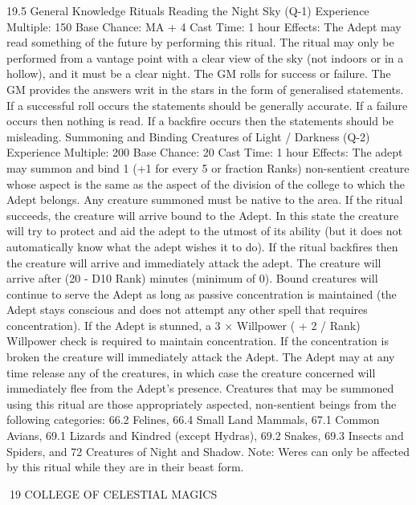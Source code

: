 \documentclass[a4paper]{article}
\begin{document}
\begin{multicols}{3}
19.5 General Knowledge Rituals
Reading the Night Sky (Q-1)
Experience Multiple: 150
Base Chance: MA + 4%
Cast Time: 1 hour
Effects: The Adept may read something of the
future by performing this ritual. The ritual may
only be performed from a vantage point with a
clear view of the sky (not indoors or in a hollow),
and it must be a clear night. The GM rolls for
success or failure. The GM provides the answers
writ in the stars in the form of generalised statements. If a successful roll occurs the statements
should be generally accurate. If a failure occurs
then nothing is read. If a backfire occurs then the
statements should be misleading.
Summoning and Binding Creatures of
Light / Darkness (Q-2)
Experience Multiple: 200
Base Chance: 20%
Cast Time: 1 hour
Effects: The adept may summon and bind 1 (+1 for
every 5 or fraction Ranks) non-sentient creature
whose aspect is the same as the aspect of the division of the college to which the Adept belongs.
Any creature summoned must be native to the area.
If the ritual succeeds, the creature will arrive bound
to the Adept. In this state the creature will try to
protect and aid the adept to the utmost of its ability
(but it does not automatically know what the adept
wishes it to do). If the ritual backfires then the
creature will arrive and immediately attack the
adept. The creature will arrive after (20 - D10 Rank) minutes (minimum of 0). Bound creatures
will continue to serve the Adept as long as passive
concentration is maintained (the Adept stays conscious and does not attempt any other spell that
requires concentration). If the Adept is stunned, a 3
× Willpower ( + 2 / Rank) Willpower check is
required to maintain concentration. If the concentration is broken the creature will immediately
attack the Adept. The Adept may at any time release any of the creatures, in which case the creature concerned will immediately flee from the
Adept’s presence.
Creatures that may be summoned using this ritual
are those appropriately aspected, non-sentient
beings from the following categories: 66.2 Felines,
66.4 Small Land Mammals, 67.1 Common Avians,
69.1 Lizards and Kindred (except Hydras), 69.2
Snakes, 69.3 Insects and Spiders, and 72 Creatures
of Night and Shadow. Note: Weres can only be
affected by this ritual while they are in their beast
form.

19 COLLEGE OF CELESTIAL MAGICS


\end{multicols}
\end{document}
